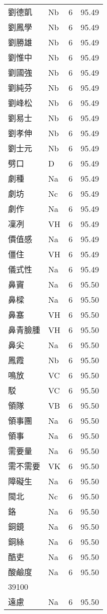 \documentclass[twocolumn]{book}
\begin{document}
\begin{supertabular}{llrr}
劉德凱 & Nb & 6 &  95.49\\
劉鳳學 & Nb & 6 &  95.49\\
劉勝雄 & Nb & 6 &  95.49\\
劉惟中 & Nb & 6 &  95.49\\
劉國強 & Nb & 6 &  95.49\\
劉純芬 & Nb & 6 &  95.49\\
劉峰松 & Nb & 6 &  95.49\\
劉易士 & Nb & 6 &  95.49\\
劉孝伸 & Nb & 6 &  95.49\\
劉士元 & Nb & 6 &  95.49\\
劈口 & D & 6 &  95.49\\
劇種 & Na & 6 &  95.49\\
劇坊 & Nc & 6 &  95.49\\
劇作 & Na & 6 &  95.49\\
凜冽 & VH & 6 &  95.49\\
價值感 & Na & 6 &  95.49\\
僵住 & VH & 6 &  95.49\\
儀式性 & Na & 6 &  95.49\\
鼻竇 & Na & 6 &  95.50\\
鼻樑 & Na & 6 &  95.50\\
鼻塞 & VH & 6 &  95.50\\
鼻青臉腫 & VH & 6 &  95.50\\
鼻尖 & Na & 6 &  95.50\\
鳳霞 & Nb & 6 &  95.50\\
鳴放 & VC & 6 &  95.50\\
駁 & VC & 6 &  95.50\\
領隊 & VB & 6 &  95.50\\
領事團 & Na & 6 &  95.50\\
領事 & Na & 6 &  95.50\\
需要量 & Na & 6 &  95.50\\
需不需要 & VK & 6 &  95.50\\
障礙生 & Na & 6 &  95.50\\
閩北 & Nc & 6 &  95.50\\
鉻 & Na & 6 &  95.50\\
銅鏡 & Na & 6 &  95.50\\
銅絲 & Na & 6 &  95.50\\
酷吏 & Na & 6 &  95.50\\
酸鹼度 & Na & 6 &  95.50\\
39100\\
遠慮 & Na & 6 &  95.50\\

\end{supertabular}
\end{document}
